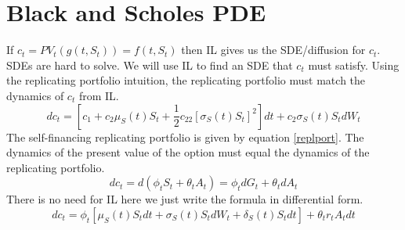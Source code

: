 
\section{Black and Scholes PDE}

If $c_t=PV_t(g(t, S_t))=f(t, S_t)$ then IL gives us the SDE/diffusion for
$c_t$. SDEs are hard to solve. We will use IL to find an SDE that $c_t$ must
satisfy. Using the replicating portfolio intuition, the replicating portfolio
must match the dynamics of $c_t$ from IL.
\begin{equation}
    dc_t=\left[ c_1+c_2\mu_S(t)S_t+\frac{1}{2}c_{22} \left[ \sigma_S(t)S_t
    \right] ^2 \right] dt + c_2\sigma_S(t)S_tdW_t
\end{equation}
The self-financing replicating portfolio is given by equation \ref{replport}.
The dynamics of the present value of the option must equal the dynamics of the
replicating portfolio.
\begin{equation}
    dc_t=d(\phi_t S_t+\theta_t A_t)=\phi_t dG_t + \theta_t dA_t
\end{equation}
There is no need for IL here we just write the formula in differential form.
\begin{equation}
    dc_t=\phi_t \left[ \mu_S(t)S_tdt + \sigma_S(t)S_tdW_t + \delta_S(t)S_tdt
    \right] + \theta_tr_tA_tdt
\end{equation}


